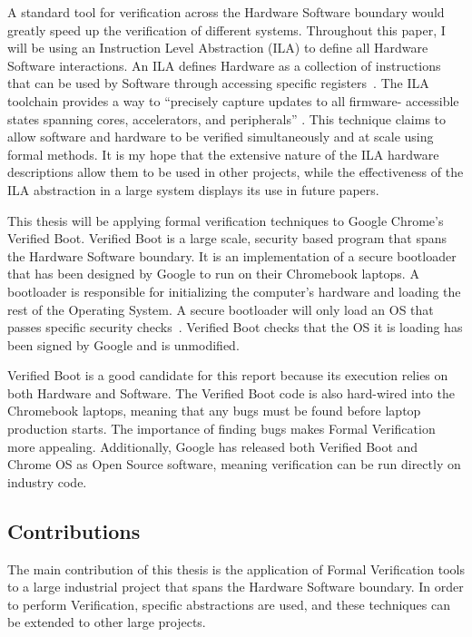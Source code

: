 A standard tool for verification across the Hardware Software boundary would
greatly speed up the verification of different systems.
Throughout this paper, I will be using an Instruction Level Abstraction (ILA) to
define all Hardware Software interactions.
An ILA defines Hardware as a collection of instructions that can be used by
Software through accessing specific registers~\cite{ila}.
The ILA toolchain provides a way to ``precisely capture updates to all firmware-
accessible states spanning cores, accelerators, and peripherals''
\cite{ila-template}.
This technique claims to allow software and hardware to be verified simultaneously and at scale using formal methods.
It is my hope that the extensive nature of the ILA hardware descriptions allow
them to be used in other projects, while the effectiveness of the ILA abstraction
in a large system displays its use in future papers. 

This thesis will be applying formal verification techniques to Google Chrome's
Verified Boot.
Verified Boot is a large scale, security based program that spans the Hardware
Software boundary. 
It is an implementation of a secure bootloader that has been designed by Google to run on their Chromebook laptops.
A bootloader is responsible for initializing the computer's hardware and
loading the rest of the Operating System.
A secure bootloader will only load an OS that passes specific
security checks~\cite{secure-bootloader}.
Verified Boot checks that the OS it is loading has been signed by Google and is
unmodified.

Verified Boot is a good candidate for this report because its execution relies
on both Hardware and Software.
The Verified Boot code is also hard-wired into the Chromebook laptops, meaning
that any bugs must be found before laptop production starts.
The importance of finding bugs makes Formal Verification more appealing.
Additionally, Google has released both Verified Boot and Chrome OS as Open
Source software, meaning verification can be run directly on industry code.

\subsection{Contributions}

The main contribution of this thesis is the application of Formal Verification
tools to a large industrial project that spans the Hardware Software boundary.
In order to perform Verification, specific abstractions are used, and these
techniques can be extended to other large projects.

